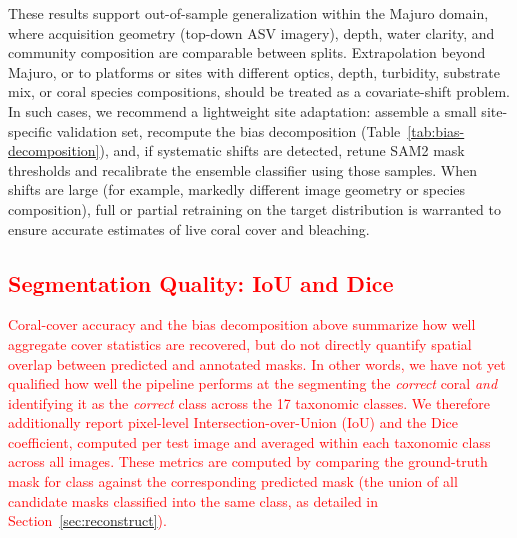 \documentclass[11pt]{elsarticle}
\newcommand{\revadd}[1]{\textcolor{red}{#1}}
\newcommand{\revdel}[1]{%
  \sbox\revdelbox{#1}%
  \makebox[0pt][l]{\raisebox{0.45ex}{\rule{\wd\revdelbox}{0.4pt}}}\usebox\revdelbox
}
\begin{document}

These results support out-of-sample generalization within the Majuro domain, where acquisition geometry (top-down ASV imagery), depth, water clarity, and community composition are comparable between splits. Extrapolation beyond Majuro, or to platforms or sites with different optics, depth, turbidity, substrate mix, or coral species compositions, should be treated as a covariate-shift problem. In such cases, we recommend a lightweight site adaptation: assemble a small site-specific validation set, recompute the bias decomposition (Table~\ref{tab:bias-decomposition}), and, if systematic shifts are detected, retune SAM2 mask thresholds and recalibrate the ensemble classifier using those samples. When shifts are large (for example, markedly different image geometry or species composition), full or partial retraining on the target distribution is warranted to ensure accurate estimates of live coral cover and bleaching.

\revadd{\subsection{Segmentation Quality: IoU and Dice}
\label{sec:iou_dice}}

\revadd{Coral-cover accuracy and the bias decomposition above summarize how well aggregate cover statistics are recovered, but do not directly quantify spatial overlap between predicted and annotated masks. In other words, we have not yet qualified how well the pipeline performs at the segmenting the \emph{correct} coral \emph{and} identifying it as the \emph{correct} class across the 17 taxonomic classes. We therefore additionally report pixel-level Intersection-over-Union (IoU) and the Dice coefficient, computed per test image and averaged within each taxonomic class across all images. These metrics are computed by comparing the ground-truth mask for class against the corresponding predicted mask (the union of all candidate masks classified into the same class, as detailed in Section~\ref{sec:reconstruct}).}
\end{document}
